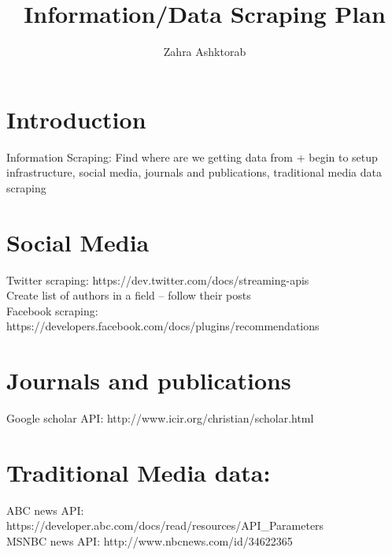 \documentclass{article}
\title{Information/Data Scraping Plan}
\author{Zahra Ashktorab}
\begin{document}
\maketitle

\section{Introduction}
Information Scraping: Find where are we getting data from + begin to setup infrastructure, social media, journals and publications, traditional media data scraping


\section{Social Media}
Twitter scraping: https://dev.twitter.com/docs/streaming-apis \\
Create list of authors in a field – follow their posts \\
Facebook scraping: https://developers.facebook.com/docs/plugins/recommendations \\

\section{Journals and publications}
Google scholar API: http://www.icir.org/christian/scholar.html \\

\section{Traditional Media data:}
ABC news API: https://developer.abc.com/docs/read/resources/API_Parameters \\
MSNBC news API: http://www.nbcnews.com/id/34622365 \\
\end{document}
